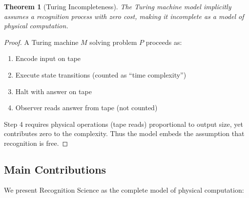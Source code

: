 \documentclass[11pt]{article}
\theoremstyle{plain}
\newtheorem{theorem}{Theorem}
\theoremstyle{definition}
\theoremstyle{remark}
\begin{document}
\begin{theorem}[Turing Incompleteness]
The Turing machine model implicitly assumes a recognition process with zero cost, making it incomplete as a model of physical computation.
\end{theorem}

\begin{proof}
A Turing machine $M$ solving problem $P$ proceeds as:
\begin{enumerate}
\item Encode input on tape
\item Execute state transitions (counted as ``time complexity'')
\item Halt with answer on tape
\item Observer reads answer from tape (not counted)
\end{enumerate}
Step 4 requires physical operations (tape reads) proportional to output size, yet contributes zero to the complexity. Thus the model embeds the assumption that recognition is free.
\end{proof}

\subsection{Main Contributions}

We present Recognition Science as the complete model of physical computation:
\end{document}

